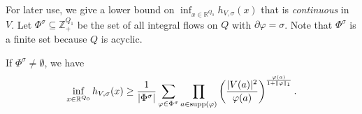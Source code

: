 \documentclass[a4paper,11pt]{article}
\numberwithin{equation}{section}
\newcommand{\R}{\mathbb{R}}
\newcommand{\Z}{\mathbb{Z}}
\DeclareMathOperator{\supp}{supp}
\DeclarePairedDelimiter{\norm}{\lVert}{\rVert}
\begin{document}
For later use, we give a lower bound on $\inf_{x \in \R^{Q_0}} h_{V, \sigma}(x)$ that is \emph{continuous} in $V$.
Let $\Phi^\sigma \subseteq \Z_+^{Q_1}$ be the set of all integral flows on $Q$ with $\partial \varphi = \sigma$.
Note that $\Phi^\sigma$ is a finite set because $Q$ is acyclic.

\begin{lemma}\label{lem:h-lower}
    If $\Phi^\sigma \ne \emptyset$, we have
    \begin{align}
        \inf_{x \in \R^{Q_0}} h_{V, \sigma}(x) \ge \frac{1}{|\Phi^\sigma|} \sum_{\varphi \in \Phi^\sigma} \prod_{a \in \supp(\varphi)} \left( \frac{|V(a)|^2}{\varphi(a)} \right)^{\frac{\varphi(a)}{1 + \norm{\varphi}_1}}.
    \end{align}
\end{lemma}
\end{document}
